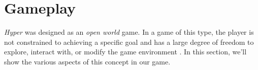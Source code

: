 \section{Gameplay}
\textit{Hyper} was designed as an \textit{open world} game.
In a game of this type, the player is not constrained to achieving a specific goal and has a large degree of freedom to explore, interact with, or modify the game environment \cite{Open-World-MW}.
In this section, we'll show the various aspects of this concept in our game.




